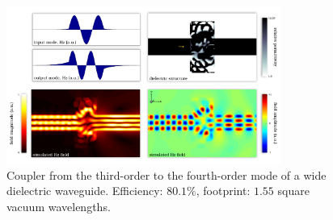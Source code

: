 \begin{figure}[h!]
    \centering
    \includegraphics[width=0.8\textwidth]{p3/11}
    \caption{
        Coupler from the third-order to the fourth-order mode 
            of a wide dielectric waveguide.
        Efficiency: $80.1\%$,
        footprint: $1.55$ square vacuum wavelengths.
        }
\end{figure}
\clearpage

